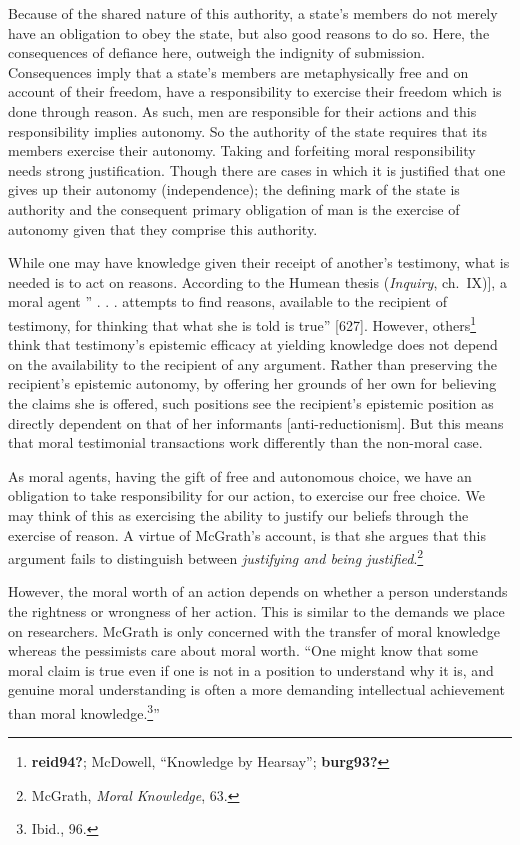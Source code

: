 \documentclass[
  12pt,
]{book}
\theoremstyle{definition}
\theoremstyle{definition}
\theoremstyle{definition}
\theoremstyle{definition}
\theoremstyle{remark}
\begin{document}
Because of the shared nature of this authority, a state's members do not merely have an obligation to obey the state, but also good reasons to do so. Here, the consequences of defiance here, outweigh the indignity of submission. Consequences imply that a state's members are metaphysically free and on account of their freedom, have a responsibility to exercise their freedom which is done through reason. As such, men are responsible for their actions and this responsibility implies autonomy. So the authority of the state requires that its members exercise their autonomy. Taking and forfeiting moral responsibility needs strong justification. Though there are cases in which it is justified that one gives up their autonomy (independence); the defining mark of the state is authority and the consequent primary obligation of man is the exercise of autonomy given that they comprise this authority.

While one may have knowledge given their receipt of another's testimony, what is needed is to act on reasons. According to the Humean thesis (\emph{Inquiry}, ch.~IX){]}, a moral agent '' . . . attempts to find reasons, available to the recipient of testimony, for thinking that what she is told is true'' {[}627{]}. However, others\footnote{\textbf{reid94?}; McDowell, {``Knowledge by {Hearsay}''}; \textbf{burg93?}} think that testimony's epistemic efficacy at yielding knowledge does not depend on the availability to the recipient of any argument. Rather than preserving the recipient's epistemic autonomy, by offering her grounds of her own for believing the claims she is offered, such positions see the recipient's epistemic position as directly dependent on that of her informants {[}anti-reductionism{]}. But this means that moral testimonial transactions work differently than the non-moral case.

As moral agents, having the gift of free and autonomous choice, we have an obligation to take responsibility for our action, to exercise our free choice. We may think of this as exercising the ability to justify our beliefs through the exercise of reason. A virtue of McGrath's account, is that she argues that this argument fails to distinguish between \emph{justifying and being justified}.\footnote{McGrath, \emph{Moral {Knowledge}}, 63.}

However, the moral worth of an action depends on whether a person understands the rightness or wrongness of her action. This is similar to the demands we place on researchers. McGrath is only concerned with the transfer of moral knowledge whereas the pessimists care about moral worth. ``One might know that some moral claim is true even if one is not in a position to understand why it is, and genuine moral understanding is often a more demanding intellectual achievement than moral knowledge.\footnote{Ibid., 96.}''
\end{document}
